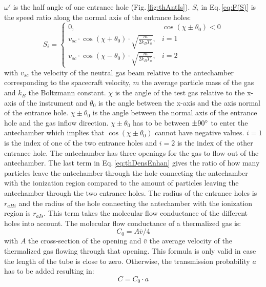 	$\omega'$ is the half angle of one entrance hole (Fig.\,\ref{fig:thAntIs}). $S_i$ in Eq.\,\eqref{eq:F(S)} is the speed ratio along the normal axis of the entrance holes:
	\begin{equation}
		S_i = 
		\begin{cases}
			0, & \cos(\chi \pm \theta_0) < 0\\
			v_{sc}\cdot \cos(\chi + \theta_0)\cdot \sqrt{\frac{m}{2k_B T_a}}, & i=1\\
			v_{sc}\cdot \cos(\chi - \theta_0)\cdot \sqrt{\frac{m}{2k_B T_a}}, & i=2
		\end{cases}
	\end{equation}
	with $v_{sc}$ the velocity of the neutral gas beam relative to the antechamber corresponding to the spacecraft velocity, $m$ the average particle mass of the gas and $k_B$ the Boltzmann constant. $\chi$ is the angle of the test gas relative to the x-axis of the instrument and $\theta_0$ is the angle between the x-axis and the axis normal of the entrance hole. $\chi \pm \theta_0$ is the angle between the normal axis of the entrance hole and the gas inflow direction. $\chi \pm \theta_0$ has to be between $\pm 90^\circ$ to enter the antechamber which implies that $\cos(\chi \pm \theta_0)$ cannot have negative values. $i=1$ is the index of one of the two entrance holes and $i=2$ is the index of the other entrance hole. The antechamber has three openings for the gas to flow out of the antechamber. The last term in Eq.\,\eqref{eq:thDensEnhan} gives the ratio of how many particles leave the antechamber through the hole connecting the antechamber with the ionization region compared to the amount of particles leaving the antechamber through the two entrance holes. The radius of the entrance holes is $r_{aHi}$ and the radius of the hole connecting the antechamber with the ionization region is $r_{aIs}$. This term takes the molecular flow conductance of the different holes into account. The molecular flow conductance of a thermalized gas is:
	\begin{equation}
		C_0 = A\bar{v}/4
		\label{eq:theoMolFlowCondC0}
	\end{equation}
	with $A$ the cross-section of the opening and $\bar{v}$ the average velocity of the thermalized gas flowing through that opening. This formula is only valid in case the length of the tube is close to zero. Otherwise, the transmission probability $a$ has to be added resulting in:
	\begin{equation}
		C = C_0 \cdot a
		\label{eq:theoMolFlowCondCEff}
	\end{equation}
